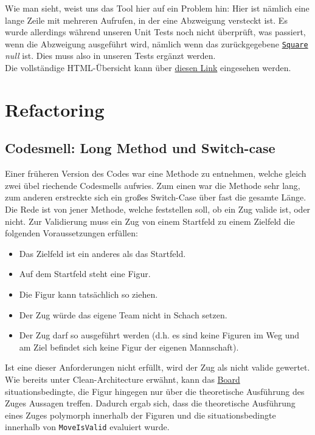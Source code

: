 \documentclass[
10pt, %
a4paper, %
oneside, %
headinclude,footinclude, %
BCOR5mm, %
]{scrartcl}
\begin{document}
\begin{onehalfspace}
Wie man sieht, weist uns das Tool hier auf ein Problem hin: Hier ist nämlich eine lange Zeile mit mehreren Aufrufen, in der eine Abzweigung versteckt ist. Es wurde allerdings während unseren Unit Tests noch nicht überprüft, was passiert, wenn die Abzweigung ausgeführt wird, nämlich wenn das zurückgegebene \texttt{\href{https://github.com/schmida736/Chess-AdvancedSE/blob/main/Chess-AdvancedSE/Game\%20Elements/Square.cs}{Square}} \textsl{null} ist. Dies muss also in unseren Tests ergänzt werden.
\\
Die vollständige HTML-Übersicht kann über \href{https://github.com/schmida736/Chess-AdvancedSE/tree/main/Chess-AdvancedSE.Tests/coverage%20results}{diesen Link} eingesehen werden.

\newpage
\section{Refactoring}
\subsection{Codesmell: Long Method und Switch-case}
Einer früheren Version des Codes war eine Methode zu entnehmen, welche gleich zwei übel riechende Codesmells aufwies. Zum einen war die Methode sehr lang, zum anderen erstreckte sich ein großes Switch-Case über fast die gesamte Länge. Die Rede ist von jener Methode, welche feststellen soll, ob ein Zug valide ist, oder nicht. Zur Validierung muss ein Zug von einem Startfeld zu einem Zielfeld die folgenden Voraussetzungen erfüllen:
\begin{center}
	\begin{itemize}
		\item Das Zielfeld ist ein anderes als das Startfeld.
		\item Auf dem Startfeld steht eine Figur.
		\item Die Figur kann tatsächlich so ziehen.
		\item Der Zug würde das eigene Team nicht in Schach setzen.
		\item Der Zug darf so ausgeführt werden (d.h. es sind keine Figuren im Weg und am Ziel befindet sich keine Figur der eigenen Mannschaft).
	\end{itemize}
\end{center}
Ist eine dieser Anforderungen nicht erfüllt, wird der Zug als nicht valide gewertet. Wie bereits unter Clean-Architecture erwähnt, kann das \href{https://github.com/schmida736/Chess-AdvancedSE/blob/main/Chess-AdvancedSE/Game\%20Elements/Board.cs}{Board} situationsbedingte, die Figur hingegen nur über die theoretische Ausführung des Zuges Aussagen treffen. Dadurch ergab sich, dass die theoretische Ausführung eines Zuges polymorph innerhalb der Figuren und die situationsbedingte innerhalb von \texttt{MoveIsValid} evaluiert wurde. 
\vspace{0.5cm}


\end{onehalfspace}
\end{document}
